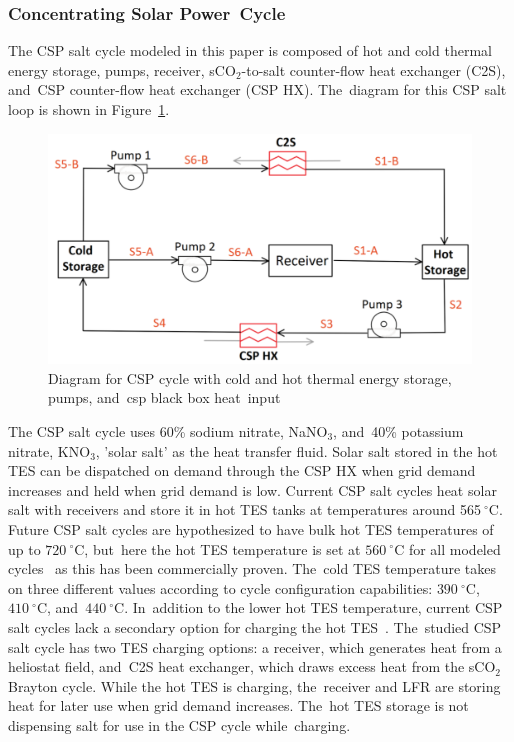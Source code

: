 \documentclass[sustainability,article,accept,moreauthors,pdftex]{Definitions/mdpi}
\begin{document}
\begin{paracol}{2}
\subsubsection{Concentrating Solar Power~Cycle}

The CSP salt cycle modeled in this paper is composed of hot and cold thermal energy storage, %
{}
pumps, receiver, sCO$_2$-to-salt counter-flow heat exchanger (C2S), and~CSP counter-flow heat exchanger (CSP HX). The~diagram for this CSP salt loop is shown in Figure~\ref{csp}. 



\begin{figure}[H] 
    \includegraphics[width=10 cm]{Definitions/csp.pdf}
    \caption{Diagram for CSP cycle with cold and hot thermal energy storage, pumps, and~csp black box heat~input\label{csp}}
\end{figure}

The CSP salt cycle uses 60\% sodium nitrate, NaNO$_3$, and~40\% potassium nitrate, KNO$_3$, 'solar salt' as the heat transfer fluid. Solar salt stored in the hot TES can be dispatched on demand through the CSP HX when grid demand increases and held when grid demand is low. Current CSP salt cycles heat solar salt with receivers and store it in hot TES tanks at temperatures around 565$~^{\circ}$C. Future CSP salt cycles are hypothesized to have bulk hot TES temperatures of up to $720~^{\circ}$C, but~here the hot TES temperature is set at $560~^{\circ}$C for all modeled cycles~\cite{mehos2017concentrating} as this has been commercially proven. The~cold TES temperature takes on three different values according to cycle configuration capabilities: $390~^{\circ}$C, $410~^{\circ}$C, and~$440~^{\circ}$C. In~addition to the lower hot TES temperature, current CSP salt cycles lack a secondary option for charging the hot TES~\cite{hamilton2020dispatch}. The~studied CSP salt cycle has two TES charging options: a receiver, which generates heat from a heliostat field, and~C2S heat exchanger, which draws excess heat from the sCO$_2$ Brayton cycle. While the hot TES is charging, the~receiver and LFR are storing heat for later use when grid demand increases. The~hot TES storage is not dispensing salt for use in the CSP cycle while~charging.


\end{paracol}
\end{document}
